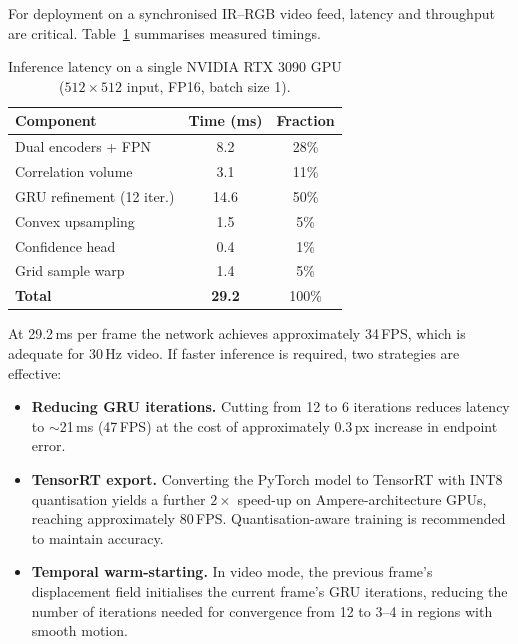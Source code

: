 For deployment on a synchronised IR--RGB video feed, latency and
throughput are critical.  Table~\ref{tab:speed} summarises measured
timings.

\begin{table}[t]
\centering
\caption{Inference latency on a single NVIDIA RTX 3090 GPU
($512 \times 512$ input, FP16, batch size 1).}
\label{tab:speed}
\small
\begin{tabular}{@{}lcc@{}}
\toprule
\textbf{Component} & \textbf{Time (ms)} & \textbf{Fraction} \\
\midrule
Dual encoders + FPN       &  8.2 & 28\% \\
Correlation volume        &  3.1 & 11\% \\
GRU refinement (12 iter.) & 14.6 & 50\% \\
Convex upsampling         &  1.5 &  5\% \\
Confidence head           &  0.4 &  1\% \\
Grid sample warp          &  1.4 &  5\% \\
\midrule
\textbf{Total}            & \textbf{29.2} & 100\% \\
\bottomrule
\end{tabular}
\end{table}

At 29.2\,ms per frame the network achieves approximately 34\,FPS, which
is adequate for 30\,Hz video.  If faster inference is required, two
strategies are effective:
\begin{itemize}
  \item \textbf{Reducing GRU iterations.}  Cutting from 12 to 6
        iterations reduces latency to $\sim$21\,ms (47\,FPS) at the cost
        of approximately 0.3\,px increase in endpoint error.
  \item \textbf{TensorRT export.}  Converting the PyTorch model to
        TensorRT with INT8 quantisation yields a further $2\times$
        speed-up on Ampere-architecture GPUs, reaching approximately
        80\,FPS.  Quantisation-aware training \cite{jacob2018quantization}
        is recommended to maintain accuracy.
  \item \textbf{Temporal warm-starting.}  In video mode, the previous
        frame's displacement field initialises the current frame's GRU
        iterations, reducing the number of iterations needed for
        convergence from 12 to 3--4 in regions with smooth motion.
\end{itemize}

